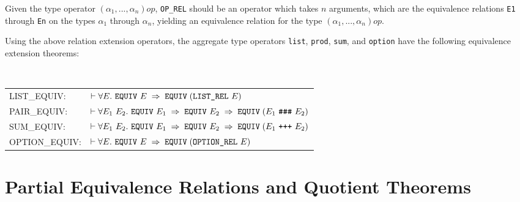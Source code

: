 \documentclass[envcountsame,runningheads]{llncs}
\begin{document}
Given the type operator $(\alpha_1,...,\alpha_n)op$,
{\tt OP\_REL} should be an operator which takes $n$ arguments,
which are the equivalence relations {\tt E1} through {\tt En}
on the types $\alpha_1$ through $\alpha_n$,
yielding
an equivalence relation for the type $(\alpha_1,...,\alpha_n)op$.

Using the above relation extension operators,
the aggregate type operators {\tt list},
{\tt prod},
{\tt sum}, and
{\tt option}
have the following equivalence extension theorems:

\vspace{3mm}

\noindent
{\tt
\begin{tabular}{ll}
LIST\_EQUIV: &
 $\vdash \forall E.\ \mbox{\tt EQUIV}\ E  \;\Rightarrow \;\mbox{\tt EQUIV}\;(\mbox{\tt LIST\_REL}\ E)$ \\
PAIR\_EQUIV: &
 $\vdash \forall E_1\ E_2.\ \mbox{\tt EQUIV}\ E_1  \;\Rightarrow \;
                            \mbox{\tt EQUIV}\ E_2  \;\Rightarrow \;
         \mbox{\tt EQUIV}\;(E_1\ \mbox{\tt \#\#\#}\ E_2)$ \\
SUM\_EQUIV: \  &
 $\vdash \forall E_1\ E_2.\ \mbox{\tt EQUIV}\ E_1  \;\Rightarrow \;
                            \mbox{\tt EQUIV}\ E_2  \;\Rightarrow \;
         \mbox{\tt EQUIV}\;(E_1\ \mbox{\tt +++}\ E_2)$ \\
OPTION\_EQUIV: &
 $\vdash \forall E.\ \mbox{\tt EQUIV}\ E  \;\Rightarrow \;\mbox{\tt EQUIV}\;(\mbox{\tt OPTION\_REL}\ E)$ \\
\end{tabular}
}


%
\section{Partial Equivalence Relations and Quotient Theorems}
%
\label{quotientrelation}
\end{document}
